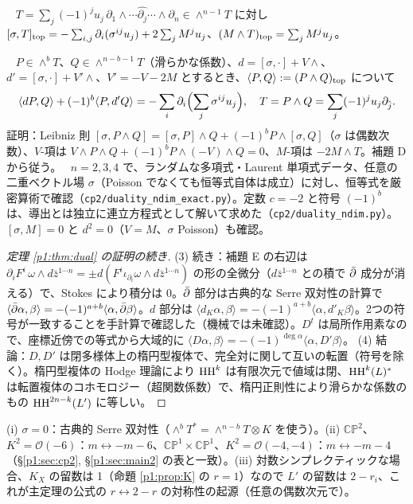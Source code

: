 \begin{lem}\tP\ \tV\label{p1:lem:D}
$T=\sum_j(-1)^ju_j\,\partial_1\wedge\cdots\widehat{\partial_j}\cdots\wedge\partial_n\in\wedge^{n-1}T$ に対し $[\sigma,T]_{\rm top}=-\sum_{i,j}\partial_i(\sigma^{ij}u_j)+2\sum_jM^ju_j$、$(M\wedge T)_{\rm top}=\sum_jM^ju_j$。
\end{lem}
\begin{lem}[補題 E：転置恒等式]\tP\ \tV\label{p1:lem:E}
$P\in\wedge^bT$、$Q\in\wedge^{n-b-1}T$（滑らかな係数）、$d=[\sigma,\cdot]+V\wedge$、$d'=[\sigma,\cdot]+V'\wedge$、$V'=-V-2M$ とするとき、$\langle P,Q\rangle:=(P\wedge Q)_{\rm top}$ について
\[\langle dP,Q\rangle+(-1)^b\langle P,d'Q\rangle=-\sum_i\partial_i\Bigl(\sum_j\sigma^{ij}u_j\Bigr),\quad T=P\wedge Q=\sum_j(-1)^ju_j\partial_{\hat j}.\]
証明：Leibniz 則 $[\sigma,P\wedge Q]=[\sigma,P]\wedge Q+(-1)^bP\wedge[\sigma,Q]$（$\sigma$ は偶数次数）、$V$-項は $V\wedge P\wedge Q+(-1)^bP\wedge(-V)\wedge Q=0$、$M$-項は $-2M\wedge T$。補題 D から従う。
\tV\ $n=2,3,4$ で、ランダムな多項式・Laurent 単項式データ、任意の二重ベクトル場 $\sigma$（Poisson でなくても恒等式自体は成立）に対し、恒等式を厳密算術で確認（\texttt{cp2/duality\_ndim\_exact.py}）。定数 $c=-2$ と符号 $(-1)^b$ は、導出とは独立に連立方程式として解いて求めた（\texttt{cp2/duality\_ndim.py}）。$[\sigma,M]=0$ と $d^2=0$（$V=M$、$\sigma$ Poisson）も確認。
\end{lem}
\begin{proof}[定理 \ref{p1:thm:dual} の証明の続き]
(3) 続き：補題 E の右辺は $\partial_iF^i\,\omega\wedge d\bar z^{1\cdots n}=\pm d(F^i\iota_{\partial_i}\omega\wedge d\bar z^{1\cdots n})$ の形の全微分（$d\bar z^{1\cdots n}$ との積で $\bar\partial$ 成分が消える）で、Stokes により積分は 0。$\bar\partial$ 部分は古典的な Serre 双対性の計算で $\langle\bar\partial\alpha,\beta\rangle=-(-1)^{a+b}\langle\alpha,\bar\partial\beta\rangle$。$d$ 部分は $\langle d_K\alpha,\beta\rangle=-(-1)^{a+b}\langle\alpha,d'_K\beta\rangle$。2つの符号が一致することを手計算で確認した（機械では未確認\tQ）。$D^t$ は局所作用素なので、座標近傍での等式から大域的に $\langle D\alpha,\beta\rangle=-(-1)^{\deg\alpha}\langle\alpha,D'\beta\rangle$。
(4) 結論：$D,D'$ は閉多様体上の楕円型複体で、完全対に関して互いの転置（符号を除く）。楕円型複体の Hodge 理論により $\mathrm{HH}^k$ は有限次元で値域は閉、$\mathrm{HH}^k(L)^*$ は転置複体のコホモロジー（超関数係数）で、楕円正則性により滑らかな係数のもの $\mathrm{HH}^{2n-k}(L')$ に等しい。\qedhere
\end{proof}
\begin{rem}[整合性の確認\ \tV]
(i) $\sigma=0$：古典的 Serre 双対性（$\wedge^bT^*=\wedge^{n-b}T\otimes K$ を使う）。(ii) $\mathbb{CP}^2$、$K^2=\mathcal O(-6)$：$m\leftrightarrow-m-6$、$\mathbb{CP}^1\times\mathbb{CP}^1$、$K^2=\mathcal O(-4,-4)$：$m\leftrightarrow-m-4$（\S\ref{p1:sec:cp2}, \S\ref{p1:sec:main2} の表と一致）。(iii) 対数シンプレクティックな場合、$K_X$ の留数は 1（命題 \ref{p1:prop:K} の $r=1$）なので $L'$ の留数は $2-r_i$、これが主定理の公式の $r\leftrightarrow2-r$ の対称性の起源（任意の偶数次元で）。
\end{rem}

